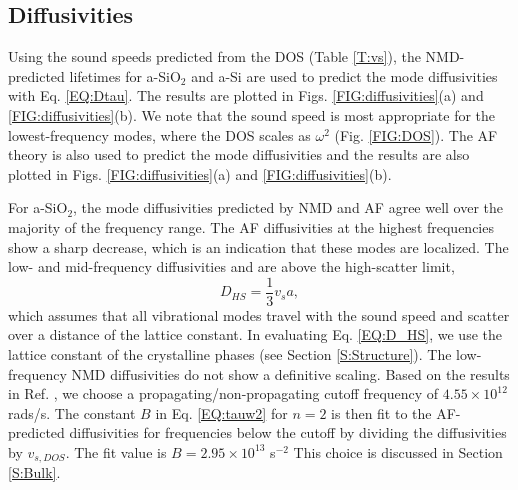 \documentclass[aps,prb,onecolumn,preprint,superscriptaddress,footinbib,amsmath,amssymb,floatfix]{revtex4}
\begin{document}
\subsection{\label{S:Diffusivities}Diffusivities}

Using the sound speeds predicted 
from the DOS (Table \ref{T:vs}), the NMD-predicted lifetimes 
for a-SiO$_2$ and a-Si are used to predict the mode diffusivities with 
Eq. \eqref{EQ:Dtau}. The results are plotted in 
Figs. \ref{FIG:diffusivities}(a) and \ref{FIG:diffusivities}(b).  
We note that the sound speed is most appropriate  
for the lowest-frequency modes, where the DOS scales as $\omega^2$ 
(Fig. \ref{FIG:DOS}). The AF theory is also used to predict the mode 
diffusivities and the results are also plotted in 
Figs. \ref{FIG:diffusivities}(a) and \ref{FIG:diffusivities}(b). 

For a-SiO$_2$, the mode diffusivities predicted by NMD and AF agree 
well over the majority of the frequency range. The AF diffusivities at 
the highest frequencies 
show a sharp decrease, which is an indication 
that these modes are localized.\cite{feldman_thermal_1993} 
The low- and mid-frequency diffusivities and are above the 
high-scatter limit, 
\begin{equation}\label{EQ:D_HS}
D_{HS} = \frac{1}{3} v_s a,
\end{equation}
which assumes that all vibrational modes travel with the sound speed  
and scatter over a distance of the lattice constant.
\cite{cahill_lattice_1988} In evaluating Eq. \eqref{EQ:D_HS}, 
we use the lattice constant of the 
crystalline phases (see Section \ref{S:Structure}). The low-frequency 
NMD diffusivities do not show a 
definitive scaling. Based on the results in 
Ref. , we choose a 
propagating/non-propagating cutoff frequency of 
$4.55\times10^{12}$ rads/s. 
The constant $B$ in Eq. \eqref{EQ:tauw2} for $n=2$ 
is then fit to the AF-predicted diffusivities for 
frequencies below the cutoff by dividing the diffusivities 
by $v_{s,DOS}$. The fit value is $B=2.95\times10^{13}$ s$^{-2}$
This choice is discussed in Section \ref{S:Bulk}.
\end{document}
